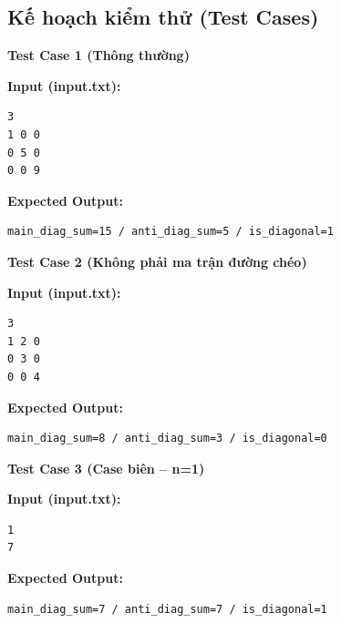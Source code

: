 \subsection{Kế hoạch kiểm thử (Test Cases)}

\textbf{Test Case 1 (Thông thường)}

\textbf{Input (input.txt):}
\begin{lstlisting}
3
1 0 0
0 5 0
0 0 9
\end{lstlisting}

\textbf{Expected Output:}
\begin{lstlisting}
main_diag_sum=15 / anti_diag_sum=5 / is_diagonal=1
\end{lstlisting}

\vspace{0.5cm}

\textbf{Test Case 2 (Không phải ma trận đường chéo)}

\textbf{Input (input.txt):}
\begin{lstlisting}
3
1 2 0
0 3 0
0 0 4
\end{lstlisting}

\textbf{Expected Output:}
\begin{lstlisting}
main_diag_sum=8 / anti_diag_sum=3 / is_diagonal=0
\end{lstlisting}

\vspace{0.5cm}

\textbf{Test Case 3 (Case biên -- n=1)}

\textbf{Input (input.txt):}
\begin{lstlisting}
1
7
\end{lstlisting}

\textbf{Expected Output:}
\begin{lstlisting}
main_diag_sum=7 / anti_diag_sum=7 / is_diagonal=1
\end{lstlisting}